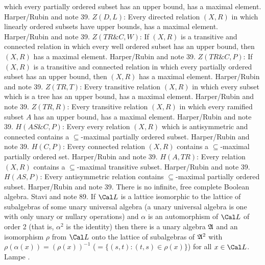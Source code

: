 which  every partially ordered subset has an upper bound, has a maximal
element.  \ac{Harper/Rubin} \cite{1976} and note 39.
\medskip
{} $Z(D,L)$: Every directed relation $(X,R)$ in which
linearly ordered subsets have upper bounds, has a maximal element.
\ac{Harper/Rubin} \cite{1976} and note 39.
\medskip
{} $Z(TR\&C,W)$: If $(X,R)$ is a transitive and
connected relation in which every well ordered subset has an upper
bound, then $(X,R)$ has a maximal element.  \ac{Harper/Rubin} \cite{1976}
and note 39.
\medskip
{} $Z(TR\&C,P)$: If $(X,R)$ is a transitive and
connected relation in which every partially ordered subset has an
upper bound, then $(X,R)$ has a maximal element. \ac{Harper/Rubin}
\cite{1976} and note 39.
\medskip
{} $Z(TR,T)$: Every transitive relation $(X,R)$ in
which every subset which is a tree has an upper bound, has a maximal
element. \ac{Harper/Rubin} \cite{1976} and note 39.
\medskip
{} $Z(TR,R)$: Every transitive relation $(X,R)$ in
which every ramified subset $A$ has an upper bound, has a maximal element.
\ac{Harper/Rubin} \cite{1976} and note 39.
\medskip
{} $H(AS\&C,P)$: Every every relation $(X,R)$ which is
antisymmetric and connected contains a $\subseteq$-maximal partially
ordered subset.  \ac{Harper/Rubin} \cite{1976} and note 39.
\medskip
{} $H(C,P)$: Every connected relation $(X,R)$
contains a $\subseteq$-maximal partially ordered set. \ac{Harper/Rubin}
\cite{1976} and note 39.
\medskip
{} $H(A,TR)$: Every relation $(X,R)$ contains a
$\subseteq$-maximal transitive subset.  \ac{Harper/Rubin} \cite{1976}
and note 39.
\medskip
{} $H(AS,P)$: Every antisymmetric relation contains
$\subseteq$-maximal partially ordered subset. \ac{Harper/Rubin} \cite{1976}
and note 39.
\medskip
{} There is no infinite, free complete Boolean
algebra.  \ac{Stavi} \cite{1975} and note 89.
\medskip
{}   If ${\Cal L}$  is  a  lattice  isomorphic  to
the  lattice  of subalgebras of some unary universal algebra (a unary
universal algebra is one with only unary or nullary operations) and
$\alpha $ is an automorphism of ${\Cal L}$ of order 2 (that is, $\alpha
^{2}$  is  the  identity) then there is a unary algebra $\frak A$  and an
isomorphism $\rho $  from ${\Cal L}$ onto the lattice of subalgebras
of $\frak A^{2}$ with $\rho(\alpha(x))=(\rho(x))^{-1}$ ($= \{(s,t) :
(t,s)\in\rho(x)\}$) for all $x\in  {\Cal L}$. \ac{Lampe} \cite{1974}.
